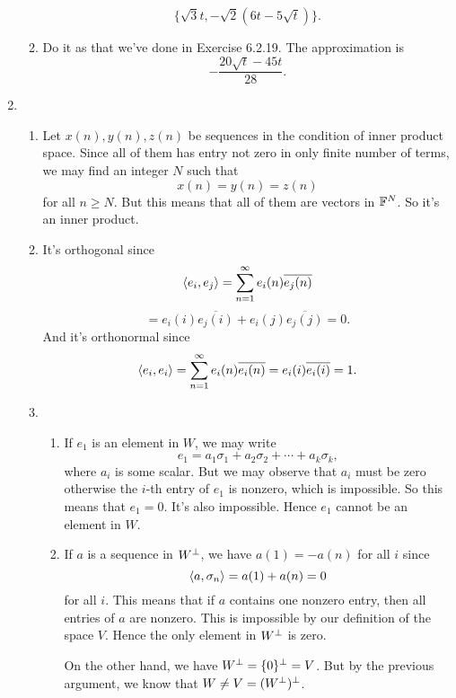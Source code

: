 \begin{enumerate}
\begin{enumerate}
\[\{\sqrt{3}t,-\sqrt{2}(6t-5\sqrt{t})\}.\]
\item Do it as that we've done in Exercise 6.2.19. The approximation is 
\[-\frac{20\sqrt{t}-45t}{28}.\]
\end{enumerate}
\item \begin{enumerate}
\item Let $x(n),y(n),z(n)$ be sequences in the condition of inner product space. Since all of them has entry not zero in only finite number of terms, we may find an integer $N$ such that 
\[x(n)=y(n)=z(n)\]
for all $n\geq N$. But this means that all of them are vectors in $\mathbb{F}^N$. So it's an inner product.
\item It's orthogonal since 
\[\langle e_i,e_j\rangle =\sum_{n=1}^{\infty}{e_i(n)\overline{e_j(n)}}\]
\[=e_i(i)\overline{e_j(i)}+e_i(j)\overline{e_j(j)}=0.\]
And it's orthonormal since 
\[\langle e_i,e_i\rangle =\sum_{n=1}^{\infty}{e_i(n)\overline{e_i(n)}}=e_i(i)\overline{e_i(i)}=1.\]
\item \begin{enumerate}
\item If $e_1$ is an element in $W$, we may write 
\[e_1=a_1\sigma_1+a_2\sigma_2+\cdots +a_k\sigma_k,\]
where $a_i$ is some scalar. But we may observe that $a_i$ must be zero otherwise the $i$-th entry of $e_1$ is nonzero, which is impossible. So this means that $e_1=0$. It's also impossible. Hence $e_1$ cannot be an element in $W$.
\item If $a$ is a sequence in $W^{\perp}$, we have $a(1)=-a(n)$ for all $i$ since 
\[\langle a,\sigma_n\rangle =a(1)+a(n)=0\]
for all $i$. This means that if $a$ contains one nonzero entry, then all entries of $a$ are nonzero. This is impossible by our definition of the space $V$. Hence the only element in $W^{\perp}$ is zero.

On the other hand, we have $W^{\perp} =\{0\}^{\perp} =V$. But by the previous argument, we know that $W\neq V=(W^{\perp})^{\perp}$.
\end{enumerate}
\end{enumerate}
\end{enumerate}
